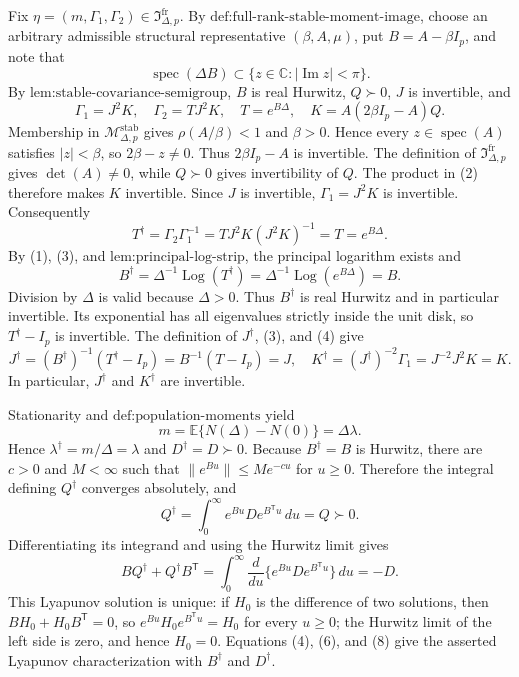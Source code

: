 Fix \(\eta=(m,\Gamma_1,\Gamma_2)\in\mathfrak I_{\Delta,p}^{\mathrm{fr}}\).  By \(\text{def:full-rank-stable-moment-image}\), choose an arbitrary admissible structural representative \((\beta,A,\mu)\), put \(B=A-\beta I_p\), and note that
\[
 \operatorname{spec}(\Delta B)\subset
 \{z\in\mathbb C:|\operatorname{Im}z|<\pi\}.
\tag{1}
\]
By \(\text{lem:stable-covariance-semigroup}\), \(B\) is real Hurwitz, \(Q\succ0\), \(J\) is invertible, and
\[
 \Gamma_1=J^2K,\quad \Gamma_2=TJ^2K,\quad
 T=e^{B\Delta},\quad K=A(2\beta I_p-A)Q.
\tag{2}
\]
Membership in \(\mathcal M_{\Delta,p}^{\mathrm{stab}}\) gives \(\rho(A/\beta)<1\) and \(\beta>0\).  Hence every \(z\in\operatorname{spec}(A)\) satisfies \(|z|<\beta\), so \(2\beta-z\neq0\).  Thus \(2\beta I_p-A\) is invertible.  The definition of \(\mathfrak I_{\Delta,p}^{\mathrm{fr}}\) gives \(\det(A)\neq0\), while \(Q\succ0\) gives invertibility of \(Q\).  The product in (2) therefore makes \(K\) invertible.  Since \(J\) is invertible, \(\Gamma_1=J^2K\) is invertible.  Consequently
\[
 T^\dagger=\Gamma_2\Gamma_1^{-1}
 =TJ^2K(J^2K)^{-1}=T=e^{B\Delta}.
\tag{3}
\]
By (1), (3), and \(\text{lem:principal-log-strip}\), the principal logarithm exists and
\[
 B^\dagger=\Delta^{-1}\operatorname{Log}(T^\dagger)
 =\Delta^{-1}\operatorname{Log}(e^{B\Delta})=B.
\tag{4}
\]
Division by \(\Delta\) is valid because \(\Delta>0\).  Thus \(B^\dagger\) is real Hurwitz and in particular invertible.  Its exponential has all eigenvalues strictly inside the unit disk, so \(T^\dagger-I_p\) is invertible.  The definition of \(J^\dagger\), (3), and (4) give
\[
 J^\dagger=(B^\dagger)^{-1}(T^\dagger-I_p)
 =B^{-1}(T-I_p)=J,
\quad
 K^\dagger=(J^\dagger)^{-2}\Gamma_1=J^{-2}J^2K=K.
\tag{5}
\]
In particular, \(J^\dagger\) and \(K^\dagger\) are invertible.

Stationarity and \(\text{def:population-moments}\) yield
\[
 m=\mathbb E\{N(\Delta)-N(0)\}=\Delta\lambda.
\tag{6}
\]
Hence \(\lambda^\dagger=m/\Delta=\lambda\) and \(D^\dagger=D\succ0\).  Because \(B^\dagger=B\) is Hurwitz, there are \(c>0\) and \(M<\infty\) such that \(\|e^{Bu}\|\leq Me^{-cu}\) for \(u\geq0\).  Therefore the integral defining \(Q^\dagger\) converges absolutely, and
\[
 Q^\dagger=\int_0^\infty e^{Bu}De^{B^{\mathsf T}u}\,du=Q\succ0.
\tag{7}
\]
Differentiating its integrand and using the Hurwitz limit gives
\[
 BQ^\dagger+Q^\dagger B^{\mathsf T}
 =\int_0^\infty\frac{d}{du}
   \{e^{Bu}De^{B^{\mathsf T}u}\}\,du=-D.
\tag{8}
\]
This Lyapunov solution is unique: if \(H_0\) is the difference of two solutions, then \(BH_0+H_0B^{\mathsf T}=0\), so \(e^{Bu}H_0e^{B^{\mathsf T}u}=H_0\) for every \(u\geq0\); the Hurwitz limit of the left side is zero, and hence \(H_0=0\).  Equations (4), (6), and (8) give the asserted Lyapunov characterization with \(B^\dagger\) and \(D^\dagger\).

